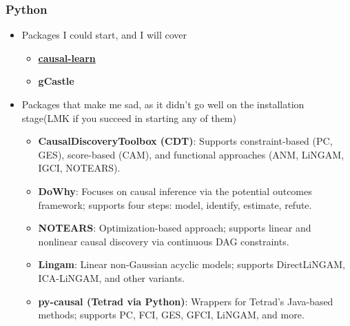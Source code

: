 \documentclass[t,24pt,aspectratio=169]{beamer}
\begin{document}
\begin{frame}[hoved]
\frametitle{Python}
\begin{itemize}
\item Packages I could start, and I will cover
\begin{itemize}
    \item \textbf{\href{https://causal-learn.readthedocs.io/en/latest/index.html}{causal-learn }}
    \item \textbf{gCastle}
\end{itemize}
\item Packages that make me sad, as it didn't go well on the installation stage(LMK if you succeed in starting any of them)
    \begin{itemize}
    \item \textbf{CausalDiscoveryToolbox (CDT)}: Supports constraint-based (PC, GES), score-based (CAM), and functional approaches (ANM, LiNGAM, IGCI, NOTEARS).
    
    \item \textbf{DoWhy}: Focuses on causal inference via the potential outcomes framework; supports four steps: model, identify, estimate, refute.

    \item \textbf{NOTEARS}: Optimization-based approach; supports linear and nonlinear causal discovery via continuous DAG constraints.

    \item \textbf{Lingam}: Linear non-Gaussian acyclic models; supports DirectLiNGAM, ICA-LiNGAM, and other variants.

    \item \textbf{py-causal (Tetrad via Python)}: Wrappers for Tetrad’s Java-based methods; supports PC, FCI, GES, GFCI, LiNGAM, and more.

    \end{itemize}
\end{itemize}
\end{frame}
\end{document}
